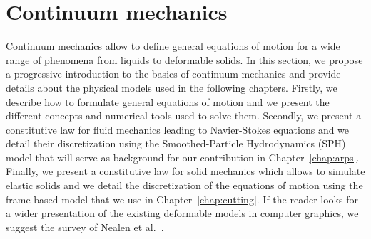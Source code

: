 \section{Continuum mechanics}
\label{sec:continuumMechanics}
Continuum mechanics allow to define general equations of motion for a wide range of phenomena from liquids to deformable solids. 
In this section, we propose a progressive introduction to the basics of continuum mechanics and provide details about the physical models used in the following chapters. 
Firstly, we describe how to formulate general equations of motion and we present the different concepts and numerical tools used to solve them.
Secondly, we present a constitutive law for fluid mechanics leading to Navier-Stokes equations and we detail their discretization using the Smoothed-Particle Hydrodynamics (SPH) model that will serve as background for our contribution in Chapter~\ref{chap:arps}.
Finally, we present a constitutive law for solid mechanics which allows to simulate elastic solids and we detail the discretization of the equations of motion using the frame-based model that we use in Chapter~\ref{chap:cutting}.
If the reader looks for a wider presentation of the existing deformable models in computer graphics, we suggest the survey of Nealen et al.~\cite{Nealen2006}.
%
